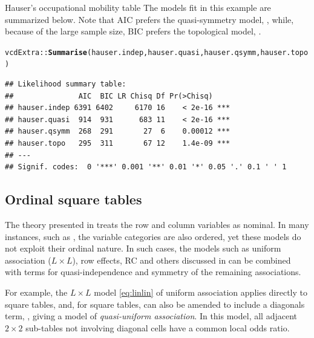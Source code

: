 \documentclass[11pt]{book}\usepackage[]{graphicx}\usepackage[]{color}
\makeatletter
\newcommand{\hlstd}[1]{\textcolor[rgb]{0.345,0.345,0.345}{#1}}%
\newcommand{\hlkwd}[1]{\textcolor[rgb]{0.737,0.353,0.396}{\textbf{#1}}}%
\newenvironment{kframe}{%
 \def\at@end@of@kframe{}%
 \ifinner\ifhmode%
  \def\at@end@of@kframe{\end{minipage}}%
  \begin{minipage}{\columnwidth}%
 \fi\fi%
 \def\FrameCommand##1{\hskip\@totalleftmargin \hskip-\fboxsep
 \colorbox{shadecolor}{##1}\hskip-\fboxsep
     \hskip-\linewidth \hskip-\@totalleftmargin \hskip\columnwidth}%
 \MakeFramed {\advance\hsize-\width
   \@totalleftmargin\z@ \linewidth\hsize
   \@setminipage}}%
 {\par\unskip\endMakeFramed%
 \at@end@of@kframe}
\newenvironment{knitrout}{}{} %
\renewenvironment{knitrout}{\small\renewcommand{\baselinestretch}{.85}}{} %
\makeatother
\begin{document}
\begin{Example}[hauser1]{Hauser's occupational mobility table}
The models fit in this example are summarized below.
Note that AIC prefers the quasi-symmetry model, ,
while, because of the large sample size, BIC prefers the topological model,
.
\begin{knitrout}
\color{fgcolor}\begin{kframe}
\begin{alltt}
\hlstd{vcdExtra::}\hlkwd{Summarise}\hlstd{(hauser.indep, hauser.quasi, hauser.qsymm, hauser.topo)}
\end{alltt}
\begin{verbatim}
## Likelihood summary table:
##               AIC  BIC LR Chisq Df Pr(>Chisq)    
## hauser.indep 6391 6402     6170 16    < 2e-16 ***
## hauser.quasi  914  931      683 11    < 2e-16 ***
## hauser.qsymm  268  291       27  6    0.00012 ***
## hauser.topo   295  311       67 12    1.4e-09 ***
## ---
## Signif. codes:  0 '***' 0.001 '**' 0.01 '*' 0.05 '.' 0.1 ' ' 1
\end{verbatim}
\end{kframe}
\end{knitrout}


\end{Example}

\subsection{Ordinal square tables}\label{sec:sq-ordinal}
The theory presented in  treats the row and column variables
as nominal.  In many instances, such as ,
the variable categories are also ordered, yet these models do not exploit
their ordinal nature.
In such cases, the models such as uniform association ($L \times L$),
row effects, RC and others discussed in 
can be combined with terms for quasi-independence and symmetry of
the remaining associations.


For example, the $L \times L$ model \eqref{eq:linlin} of uniform association
applies directly to square tables, and, for square tables, can also be
amended to include a diagonals term, , giving a model
of \emph{quasi-uniform association}.  In this model, all adjacent
$2 \times 2$ sub-tables not involving diagonal cells have a common
local odds ratio.
\end{document}
